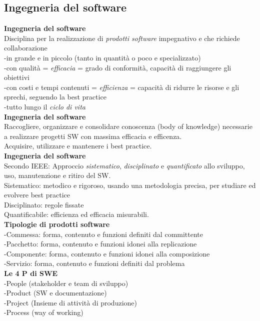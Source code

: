 \documentclass{article}
\begin{document}
	\subsection{Ingegneria del software}
		\textbf{Ingegneria del software}\\
		Disciplina per la realizzazione di \textit{prodotti software} impegnativo e che richiede collaborazione\\
		-in grande e in piccolo (tanto in quantità o poco e specializzato)\\
		-con qualità = \textit{efficacia} = grado di conformità, capacità di raggiungere gli obiettivi\\
		-con costi e tempi contenuti = \textit{efficienza} = capacità di ridurre le risorse e gli sprechi, seguendo la best practice \\
		-tutto lungo il \textit{ciclo di vita}\\
		
		\textbf{Ingegneria del software}\\
		Raccogliere, organizzare e consolidare conoscenza (body of knowledge) necessarie a realizzare progetti SW con massima efficacia e efficenza.\\
		Acquisire, utilizzare e mantenere i best practice.\\
		
		
		\textbf{Ingegneria del software}\\
		Secondo IEEE: Approccio \textit{sistematico}, \textit{disciplinato} e \textit{quantificato} allo sviluppo, uso, manutenzione e ritiro del SW.\\
		Sistematico: metodico e rigoroso, usando una metodologia precisa, per studiare ed evolvere best practice\\
		Disciplinato: regole fissate\\
		Quantificabile: efficienza ed efficacia misurabili.\\
		
		
		\textbf{Tipologie di prodotti software}\\
		-Commessa: forma, contenuto e funzioni definiti dal committente\\
		-Pacchetto: forma, contenuto e funzioni idonei alla replicazione\\
		-Componente: forma, contenuto e funzioni idonei alla composizione\\
		-Servizio: forma, contenuto e funzioni definiti dal problema\\
		
		\textbf{Le 4 P di SWE}\\
		-People (stakeholder e team di sviluppo)\\
		-Product (SW e documentazione)\\
		-Project (Insieme di attività di produzione)\\
		-Process (way of working)\\
		
\end{document}
